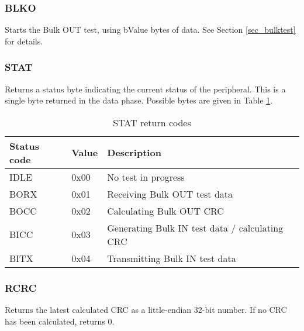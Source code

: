 \documentclass{book}
\begin{document}
\subsubsection{BLKO}

Starts the Bulk OUT test, using bValue bytes of data.  See Section \ref{sec_bulktest} for details.

\subsubsection{STAT}

Returns a status byte indicating the current status of the peripheral.  This is a single byte returned in the data phase.  Possible bytes are given in Table \ref{tbl_stat_return_codes}.

\begin{table}
\begin{tabularx}{\textwidth}{|l|l|X|}
\hline
Status code & Value & Description \\ 
\hline
\hline
IDLE & 0x00 & No test in progress \\ 
\hline
BORX & 0x01 & Receiving Bulk OUT test data \\ 
\hline
BOCC & 0x02 & Calculating Bulk OUT CRC \\ 
\hline
BICC & 0x03 & Generating Bulk IN test data / calculating CRC \\ 
\hline
BITX & 0x04 & Transmitting Bulk IN test data \\ 
\hline
\end{tabularx}
\caption{STAT return codes}
\label{tbl_stat_return_codes}
\end{table}

\subsubsection{RCRC}

Returns the latest calculated CRC as a little-endian 32-bit number.  If no CRC has been calculated, returns 0.
\end{document}

